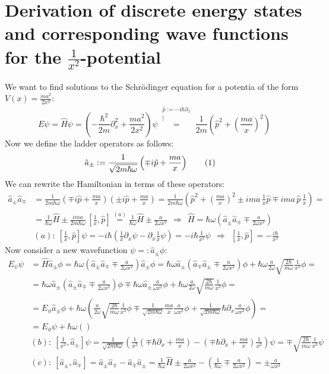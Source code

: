 \documentclass[a4paper,12pt]{article}
\newcommand\numberthis{\addtocounter{equation}{1}\tag{\theequation}}
\begin{document}
\section{Derivation of discrete energy states and corresponding wave functions for the $\frac{1}{x^2}$-potential}
We want to find solutions to the Schrödinger equation for a potentia of the form $V(x)=\frac{ma^2}{2x^2}$:
$$E\psi =\hat{H}\psi = \left(-\frac{\hbar^2}{2m}\partial_x^2+\frac{ma^2}{2x^2}\right)\psi \overset{\substack{ \hat{p}:=-i\hbar\partial_x\\|}}{=}\frac{1}{2m}\left(\hat{p}^2 +(\frac{ma}{x})^2\right)$$
Now we define the ladder operators as follows:
\begin{align*}
\hat{a}_\pm&:=\frac{1}{\sqrt{2m\hbar\omega}}\left(\mp i\hat{p}+\frac{ma}{x}\right) \label{a2 pm}\numberthis
\end{align*}
We can rewrite the Hamiltonian in terms of these operators:
\begin{align*}
\hat{a}_\pm\hat{a}_\mp&=\frac{1}{2m\hbar\omega}\left(\mp i\hat{p}+\frac{ma}{x}\right)\left(\pm i\hat{p}+\frac{ma}{x}\right)=\frac{1}{2m\hbar\omega}\left(\hat{p}^2+(\frac{ma}{x})^2\pm ima\,\frac{1}{x}\hat{p}\mp ima\,\hat{p}\,\frac{1}{x}\right)=\\
&=\frac{1}{\hbar\omega}\hat{H}\pm \frac{ima}{2m\hbar\omega}\,[\frac{1}{x},\hat{p}]\overset{(a)}{=}\frac{1}{\hbar\omega}\hat{H}\pm\frac{a}{2\omega x^2}\ \ \Rightarrow\ \ \hat{H}=\hbar\omega\left(\hat{a}_\pm\hat{a}_\mp\mp\frac{a}{2\omega x^2}\right)\\
&(a):\ [\frac{1}{x},\hat{p}]\psi =-i\hbar (\frac{1}{x}\partial_x\psi-\partial_x \frac{1}{x}\psi)=-i\hbar\frac{1}{x^2}\psi\ \ \Rightarrow\ \ [\frac{1}{x},\hat{p}]=-\frac{i\hbar}{x^2}
\end{align*}
Now consider a new wavefunction $\psi=:\hat{a}_\pm\phi$:
\begin{align*}
E_\psi\psi&=\hat{H}\hat{a}_\pm\phi=\hbar\omega (\hat{a}_\pm\hat{a}_\mp\mp\frac{a}{2\omega x^2})\hat{a}_\pm\phi=\hbar\omega\hat{a}_\pm (\hat{a}_\mp\hat{a}_\pm\mp\frac{a}{2\omega x^2})\phi+\hbar\omega\frac{a}{2\omega}\sqrt{\frac{2\hbar}{m\omega}}\frac{1}{x^3}\phi=\\
&=\hbar\omega\hat{a}_\pm(\hat{a}_\pm\hat{a}_\mp\mp\frac{a}{2\omega x^2})\phi\mp\hbar\omega\hat{a}_\pm\frac{a}{\omega x^2}\phi+\hbar\omega\frac{a}{2\omega}\sqrt{\frac{2\hbar}{m\omega}}\frac{1}{x^3}\phi=\\
&=E_\phi\hat{a}_\pm\phi+\hbar\omega\left(\frac{a}{2\omega}\sqrt{\frac{2\hbar}{m\omega}}\frac{1}{x^3}\phi\mp\frac{1}{\sqrt{2m\hbar\omega}}\frac{ma}{x}\frac{a}{\omega x^2}\phi +\frac{1}{\sqrt{2m\hbar\omega}}\hbar\partial_x\frac{a}{\omega x^2}\phi\right)=\\
&=E_\phi\psi+\hbar\omega\left(\right)\\
&(b):\ [\frac{1}{x^2},\hat{a}_\pm]\psi=\frac{1}{\sqrt{2m\hbar\omega}}\left(\frac{1}{x^2}(\mp\hbar\partial_x+\frac{ma}{x})-(\mp\hbar\partial_x+\frac{ma}{x})\frac{1}{x^2}\right)\psi=\mp\sqrt{\frac{2\hbar}{m\omega}}\frac{1}{x^3}\psi\\
&(c):\ [\hat{a}_\pm,\hat{a}_\mp]=\hat{a}_\pm\hat{a}_\mp-\hat{a}_\mp\hat{a}_\pm =\frac{1}{\hbar\omega}\hat{H}\pm\frac{a}{2\omega x^2}-\left(\frac{1}{\hbar\omega}\mp\frac{a}{2\omega x^2}\right)=\pm\frac{a}{\omega x^2}
\end{align*}
\end{document}
